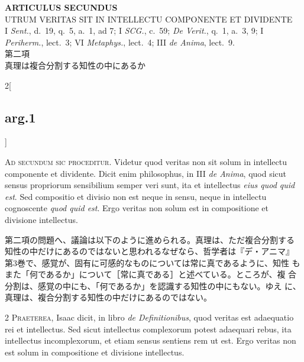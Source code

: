 \documentclass[paper=a4paper,fontsize=10pt,jafontsize=9pt,titlepage]{jlreq}
\begin{document}
{}
\setcounter{section}{2}
\setcounter{subsection}{0}
\begin{center}
 {\Large {\bfseries ARTICULUS SECUNDUS}}\\
 {\large UTRUM VERITAS SIT IN INTELLECTU COMPONENTE ET DIVIDENTE}\\
 {\footnotesize I {\itshape Sent.}, d.~19, q.~5, a.~1, ad 7; I {\itshape
 SCG.}, c.~59; {\itshape De Verit.}, q.~1, a.~3, 9; I {\itshape
 Periherm.}, lect.~3; VI {\itshape Metaphys.}, lect.~4; III {\itshape de
 Anima}, lect.~9.}\\
 {\Large 第二項\\真理は複合分割する知性の中にあるか}
\end{center}

\begin{paracol}{2}[\subsection{arg.1}]


{\huge A}{\scshape d secundum sic proceditur}. Videtur quod veritas non
sit solum in intellectu componente et dividente. Dicit enim philosophus,
in III {\itshape de Anima}, quod sicut sensus propriorum sensibilium
semper veri sunt, ita et intellectus {\itshape eius quod quid est}. Sed
compositio et divisio non est neque in sensu, neque in intellectu
cognoscente {\itshape quod quid est}. Ergo veritas non solum est in
compositione et divisione intellectus.

\switchcolumn

第二項の問題へ、議論は以下のように進められる。真理は、ただ複合分割する
知性の中だけにあるのではないと思われるなぜなら、哲学者は『デ・アニマ』
第3巻で、感覚が、固有に可感的なものについては常に真であるように、知性
もまた「何であるか」について［常に真である］と述べている。ところが、複
合分割は、感覚の中にも、「何であるか」を認識する知性の中にもない。ゆえ
に、真理は、複合分割する知性の中だけにあるのではない。



{\scshape 2 Praeterea}, Isaac dicit, in libro {\itshape de
Definitionibus}, quod veritas est adaequatio rei et intellectus. Sed
sicut intellectus complexorum potest adaequari rebus, ita intellectus
incomplexorum, et etiam sensus sentiens rem ut est. Ergo veritas non
est solum in compositione et divisione intellectus.


\end{paracol}
\end{document}
